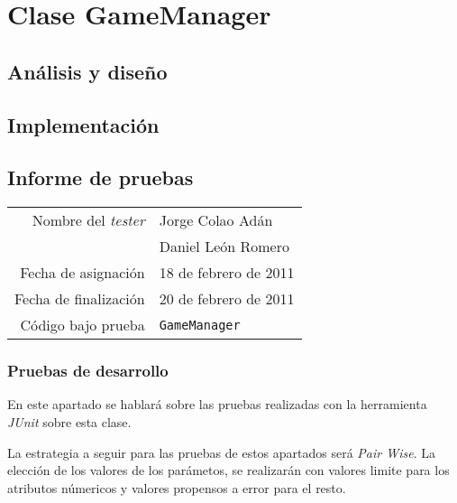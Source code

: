 \section{Clase GameManager}

\subsection{Análisis y diseño}

\subsection{Implementación}

\subsection{Informe de pruebas}

{\small
\begin{tabular}{r|l}
Nombre del \textit{tester} & Jorge Colao Adán \\
& Daniel León Romero\\
Fecha de asignación & 18 de febrero de 2011 \\
Fecha de finalización & 20 de febrero de 2011 \\
Código bajo prueba & \texttt{GameManager}
\end{tabular}
}

\subsubsection{Pruebas de desarrollo}

En este apartado se hablará sobre las pruebas realizadas con la herramienta \textit{JUnit} sobre esta clase.

La estrategia a seguir para las pruebas de estos apartados será \textit{Pair Wise}. La elección de los valores de los parámetos, se realizarán con valores limite para los atributos númericos y valores propensos a error para el resto.

